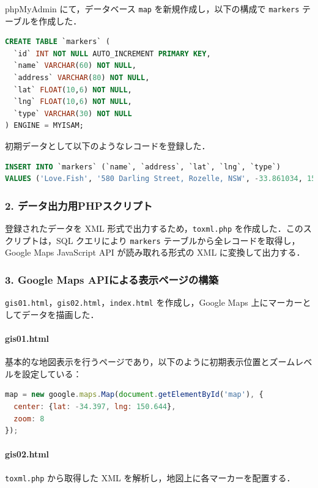 phpMyAdmin にて，データベース \texttt{map} を新規作成し，以下の構成で \texttt{markers} テーブルを作成した．

\begin{lstlisting}[language=SQL]
CREATE TABLE `markers` ( 
  `id` INT NOT NULL AUTO_INCREMENT PRIMARY KEY, 
  `name` VARCHAR(60) NOT NULL, 
  `address` VARCHAR(80) NOT NULL, 
  `lat` FLOAT(10,6) NOT NULL, 
  `lng` FLOAT(10,6) NOT NULL, 
  `type` VARCHAR(30) NOT NULL 
) ENGINE = MYISAM;
\end{lstlisting}

初期データとして以下のようなレコードを登録した．

\begin{lstlisting}[language=SQL]
INSERT INTO `markers` (`name`, `address`, `lat`, `lng`, `type`)
VALUES ('Love.Fish', '580 Darling Street, Rozelle, NSW', -33.861034, 151.171936, 'restaurant');
\end{lstlisting}

\subsubsection*{2. データ出力用PHPスクリプト}

登録されたデータを XML 形式で出力するため，\texttt{toxml.php} を作成した．このスクリプトは，SQL クエリにより \texttt{markers} テーブルから全レコードを取得し，Google Maps JavaScript API が読み取れる形式の XML に変換して出力する．

\subsubsection*{3. Google Maps APIによる表示ページの構築}

\texttt{gis01.html}，\texttt{gis02.html}，\texttt{index.html} を作成し，Google Maps 上にマーカーとしてデータを描画した．

\paragraph*{gis01.html}
基本的な地図表示を行うページであり，以下のように初期表示位置とズームレベルを設定している：

\begin{lstlisting}[language=javascript]
map = new google.maps.Map(document.getElementById('map'), {
  center: {lat: -34.397, lng: 150.644},
  zoom: 8
});
\end{lstlisting}

\paragraph*{gis02.html}
\texttt{toxml.php} から取得した XML を解析し，地図上に各マーカーを配置する．


